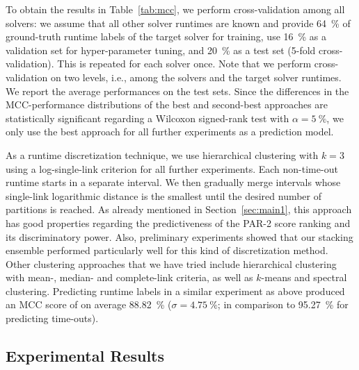 \documentclass[runningheads]{llncs}
\begin{document}

To obtain the results in Table~\ref{tab:mcc}, we perform cross-validation among all solvers: we assume that all other solver runtimes are known and provide \SI{64}{\%} of ground-truth runtime labels of the target solver for training, use \SI{16}{\%} as a validation set for hyper-parameter tuning, and \SI{20}{\%} as a test set (5-fold cross-validation).
This is repeated for each solver once.
Note that we perform cross-validation on two levels, i.e., among the solvers and the target solver runtimes.
We report the average performances on the test sets.
Since the differences in the MCC-performance distributions of the best and second-best approaches are statistically significant regarding a Wilcoxon signed-rank test with $\alpha = \SI{5}{\%}$, we only use the best approach for all further experiments as a prediction model.

As a runtime discretization technique, we use hierarchical clustering with $k = 3$ using a log-single-link criterion for all further experiments.
Each non-time-out runtime starts in a separate interval.
We then gradually merge intervals whose single-link logarithmic distance is the smallest until the desired number of partitions is reached.
As already mentioned in Section~\ref{sec:main1}, this approach has good properties regarding the predictiveness of the PAR-2 score ranking and its discriminatory power.
Also, preliminary experiments showed that our stacking ensemble performed particularly well for this kind of discretization method.
Other clustering approaches that we have tried include hierarchical clustering with mean-, median- and complete-link criteria, as well as $k$-means and spectral clustering.
Predicting runtime labels in a similar experiment as above produced an MCC score of on average \SI{88.82}{\%} ($\sigma = \SI{4.75}{\%}$; in comparison to \SI{95.27}{\%} for predicting time-outs).

\subsection{Experimental Results}
\end{document}
